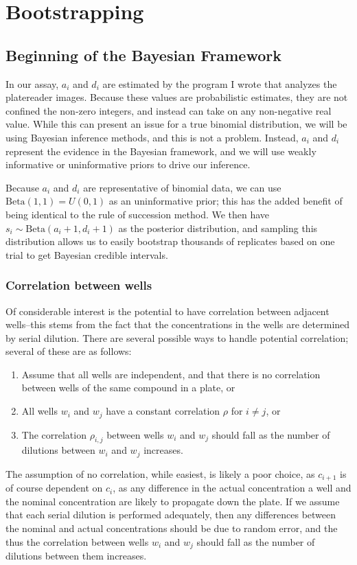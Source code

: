 \documentclass[11pt, letterpaper]{article}
\newcommand{\Beta}{\text{Beta}}
\numberwithin{equation}{section}
\begin{document}
\section{Bootstrapping}
\subsection{Beginning of the Bayesian Framework}
In our assay, $a_i$ and $d_i$ are estimated by the program I wrote that analyzes the platereader images. Because these values are probabilistic estimates, they are not confined the non-zero integers, and instead can take on any non-negative real value. While this can present an issue for a true binomial distribution, we will be using Bayesian inference methods, and this is not a problem. Instead, $a_i$ and $d_i$ represent the evidence in the Bayesian framework, and we will use weakly informative or uninformative priors to drive our inference. 

Because $a_i$ and $d_i$ are representative of binomial data, we can use $\Beta (1,1) = U(0,1)$ as an uninformative prior; this has the added benefit of being identical to the rule of succession method. We then have $s_i \sim \Beta(a_i + 1, d_i +1)$ as the posterior distribution, and sampling this distribution allows us to easily bootstrap thousands of replicates based on one trial to get Bayesian credible intervals. 
\subsubsection{Correlation between wells}
Of considerable interest is the potential to have correlation between adjacent wells--this stems from the fact that the concentrations in the wells are determined by serial dilution. There are several possible ways to handle potential correlation; several of these are as follows: 
\begin{enumerate}
\item Assume that all wells are independent, and that there is no correlation between wells of the same compound in a plate, or
\item All wells $w_i$ and $w_j$ have a constant correlation $\rho$ for $i \neq j$, or
\item The correlation $\rho_{i,j}$ between wells $w_i$ and $w_j$ should fall as the number of dilutions between $w_i$ and $w_j$ increases. 
\end{enumerate}
The assumption of no correlation, while easiest, is likely a poor choice, as $c_{i+1}$ is of course dependent on $c_i$, as any difference in the actual concentration a well and the nominal concentration are likely to propagate down the plate. If we assume that each serial dilution is performed adequately, then any differences between the nominal and actual concentrations should be due to random error, and the thus the correlation between wells $w_i$ and $w_j$ should fall as the number of dilutions between them increases. 
\end{document}
